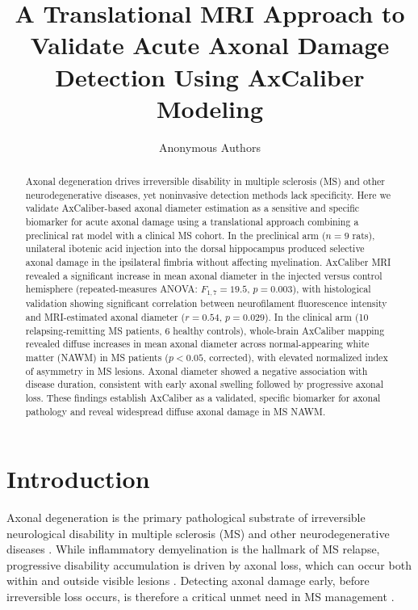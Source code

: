 \documentclass[11pt]{article}
\title{A Translational MRI Approach to Validate Acute Axonal Damage Detection Using AxCaliber Modeling}
\author{Anonymous Authors}
\date{}
\begin{document}
\maketitle

\begin{abstract}
Axonal degeneration drives irreversible disability in multiple sclerosis (MS) and other neurodegenerative diseases, yet noninvasive detection methods lack specificity. Here we validate AxCaliber-based axonal diameter estimation as a sensitive and specific biomarker for acute axonal damage using a translational approach combining a preclinical rat model with a clinical MS cohort. In the preclinical arm ($n = 9$ rats), unilateral ibotenic acid injection into the dorsal hippocampus produced selective axonal damage in the ipsilateral fimbria without affecting myelination. AxCaliber MRI revealed a significant increase in mean axonal diameter in the injected versus control hemisphere (repeated-measures ANOVA: $F_{1,7} = 19.5$, $p = 0.003$), with histological validation showing significant correlation between neurofilament fluorescence intensity and MRI-estimated axonal diameter ($r = 0.54$, $p = 0.029$). In the clinical arm (10 relapsing-remitting MS patients, 6 healthy controls), whole-brain AxCaliber mapping revealed diffuse increases in mean axonal diameter across normal-appearing white matter (NAWM) in MS patients ($p < 0.05$, corrected), with elevated normalized index of asymmetry in MS lesions. Axonal diameter showed a negative association with disease duration, consistent with early axonal swelling followed by progressive axonal loss. These findings establish AxCaliber as a validated, specific biomarker for axonal pathology and reveal widespread diffuse axonal damage in MS NAWM.
\end{abstract}

\section{Introduction}

Axonal degeneration is the primary pathological substrate of irreversible neurological disability in multiple sclerosis (MS) and other neurodegenerative diseases \citep{trapp1998axonal, dutta2011mechanisms}. While inflammatory demyelination is the hallmark of MS relapse, progressive disability accumulation is driven by axonal loss, which can occur both within and outside visible lesions \citep{lassmann2012progressive, kutzelnigg2005cortical}. Detecting axonal damage early, before irreversible loss occurs, is therefore a critical unmet need in MS management \citep{compston2008multiple, filippi2012mri}.
\end{document}
